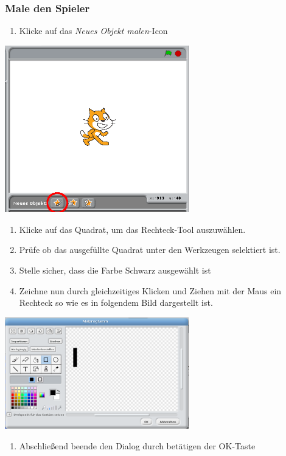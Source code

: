 \subsubsection{Male den Spieler}
\begin{enumerate}
\item Klicke auf das \textit{Neues Objekt malen}-Icon
\end{enumerate}
\includegraphics[width=0.6\textwidth]{images/aufgabe4_neues_objekt_malen.png}
\begin{enumerate}\addtocounter{enumi}{1}
\item Klicke auf das Quadrat, um das Rechteck-Tool auszuwählen.
\item Prüfe ob das ausgefüllte Quadrat unter den Werkzeugen selektiert ist.
\item Stelle sicher, dass die Farbe Schwarz ausgewählt ist
\item Zeichne nun durch gleichzeitiges Klicken und Ziehen mit der Maus ein Rechteck so wie es in folgendem Bild dargestellt ist.
\end{enumerate}
\includegraphics[width=0.6\textwidth]{images/aufgabe5_pong_sprite_spieler_malen.png}
\begin{enumerate}\addtocounter{enumi}{5}
\item Abschließend beende den Dialog durch betätigen der OK-Taste
\end{enumerate}
